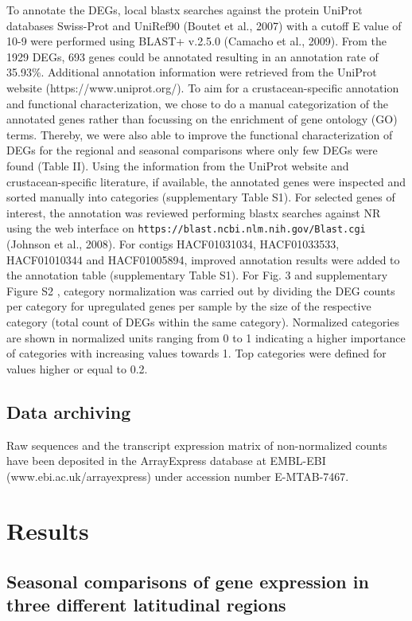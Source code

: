 To annotate the DEGs, local blastx searches against the protein UniProt
databases Swiss-Prot and UniRef90 (Boutet et al., 2007) with a cutoff E value
of 10-9 were performed using BLAST+ v.2.5.0 (Camacho et al., 2009). From the
1929 DEGs, 693 genes could be annotated resulting in an annotation rate of
35.93\%. Additional annotation information were retrieved from the UniProt
website (https://www.uniprot.org/). To aim for a crustacean-specific annotation
and functional characterization, we chose to do a manual categorization of the
annotated genes rather than focussing on the enrichment of gene ontology (GO)
terms. Thereby, we were also able to improve the functional characterization of
DEGs for the regional and seasonal comparisons where only few DEGs were found
(Table II). Using the information from the UniProt website and
crustacean-specific literature, if available, the annotated genes were
inspected and sorted manually into categories (supplementary Table S1). For
selected genes of interest, the annotation was reviewed performing blastx
searches against NR using the web interface on
\texttt{https://blast.ncbi.nlm.nih.gov/Blast.cgi}  (Johnson et al., 2008). For
contigs HACF01031034, HACF01033533, HACF01010344 and HACF01005894, improved
annotation results were added to the annotation table (supplementary Table S1).
For Fig. 3 and supplementary Figure S2 , category normalization was carried out
by dividing the DEG counts per category for upregulated genes per sample by the
size of the respective category (total count of DEGs within the same category).
Normalized categories are shown in normalized units ranging from 0 to 1
indicating a higher importance of categories with increasing values towards 1.
Top categories were defined for values higher or equal to 0.2.

\subsection{Data archiving}

Raw sequences and the transcript expression matrix of non-normalized counts
have been deposited in the ArrayExpress database at EMBL-EBI
(www.ebi.ac.uk/arrayexpress) under accession number E-MTAB-7467.  

\section{Results}

\subsection{Seasonal comparisons of gene expression in three different latitudinal regions}

